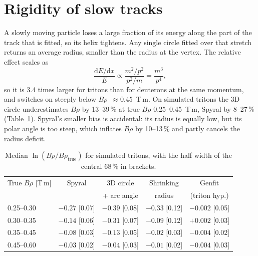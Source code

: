 \documentclass[11pt,a4paper]{article}
\newcommand{\brho}{$B\rho$}
\begin{document}
\section{Rigidity of slow tracks}

A slowly moving particle loses a large fraction of its energy along the part of the track that is fitted, so its
helix tightens. Any single circle fitted over that stretch returns an average radius, smaller than the radius at the
vertex. The relative effect scales as
\begin{equation}
  \frac{\mathrm{d}E/\mathrm{d}x}{E} \propto \frac{m^2/p^2}{p^2/m} = \frac{m^3}{p^4},
\end{equation}
so it is 3.4 times larger for tritons than for deuterons at the same momentum, and switches on steeply below
\brho~$\approx0.45$~T\,m. On simulated tritons the 3D circle underestimates \brho{} by 13--39\,\% at true
\brho{} 0.25--0.45~T\,m, Spyral by 8--27\,\% (Table~\ref{tab:brhobias}). Spyral's smaller bias is accidental: its
radius is equally low, but its polar angle is too steep, which inflates \brho{} by 10--13\,\% and partly cancels the
radius deficit.

\begin{table}[htbp]
  \centering
  \caption{Median $\ln(B\rho/B\rho_\mathrm{true})$ for simulated tritons, with the half width of the central 68\,\%
  in brackets.}
  \label{tab:brhobias}
  \small
  \begin{tabular}{lcccc}
    \toprule
    True \brho{} [T\,m] & Spyral & 3D circle & Shrinking & Genfit \\
    & & + arc angle & radius & (triton hyp.) \\
    \midrule
    0.25--0.30 & $-0.27$ [0.07] & $-0.39$ [0.08] & $-0.33$ [0.12] & $-0.002$ [0.05] \\
    0.30--0.35 & $-0.14$ [0.06] & $-0.31$ [0.07] & $-0.09$ [0.12] & $+0.002$ [0.03] \\
    0.35--0.45 & $-0.08$ [0.03] & $-0.13$ [0.05] & $-0.02$ [0.03] & $-0.004$ [0.02] \\
    0.45--0.60 & $-0.03$ [0.02] & $-0.04$ [0.03] & $-0.01$ [0.02] & $-0.004$ [0.03] \\
    \bottomrule
  \end{tabular}
\end{table}
\end{document}
